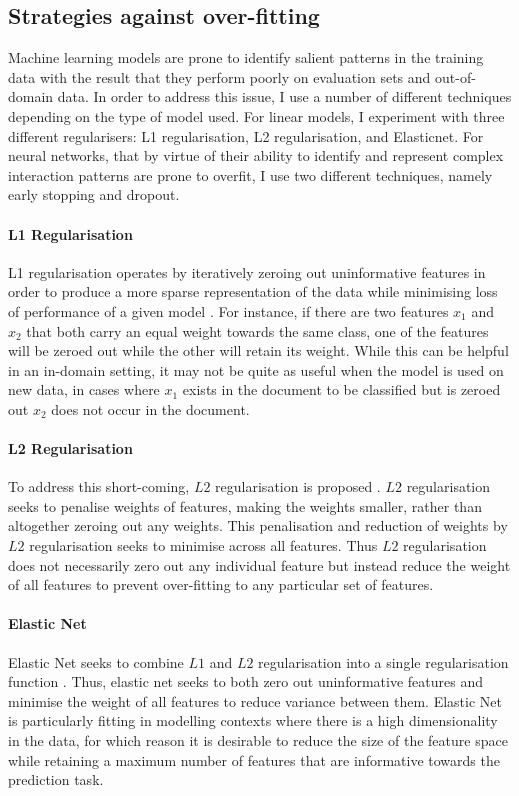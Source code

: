 \subsection{Strategies against over-fitting}\label{sec:anti-overfit}

Machine learning models are prone to identify salient patterns in the training data with the result that they perform poorly on evaluation sets and out-of-domain data. In order to address this issue, I use a number of different techniques depending on the type of model used.
For linear models, I experiment with three different regularisers: L1 regularisation, L2 regularisation, and Elasticnet.
For neural networks, that by virtue of their ability to identify and represent complex interaction patterns are prone to overfit, I use two different techniques, namely early stopping and dropout.

\paragraph*{L1 Regularisation} L1 regularisation operates by iteratively zeroing out uninformative features in order to produce a more sparse representation of the data while minimising loss of performance of a given model \citep{Goldberg:2017}. For instance, if there are two features $x_1$ and $x_2$ that both carry an equal weight towards the same class, one of the features will be zeroed out while the other will retain its weight. While this can be helpful in an in-domain setting, it may not be quite as useful when the model is used on new data, in cases where $x_1$ exists in the document to be classified but is zeroed out $x_2$ does not occur in the document.

\paragraph*{L2 Regularisation} To address this short-coming, $L2$ regularisation is proposed \citep{Goldberg:2017}. $L2$ regularisation seeks to penalise weights of features, making the weights smaller, rather than altogether zeroing out any weights. This penalisation and reduction of weights by $L2$ regularisation seeks to minimise across all features. Thus $L2$ regularisation does not necessarily zero out any individual feature but instead reduce the weight of all features to prevent over-fitting to any particular set of features.

\paragraph*{Elastic Net} Elastic Net seeks to combine $L1$ and $L2$ regularisation into a single regularisation function \citep{Goldberg:2017}. Thus, elastic net seeks to both zero out uninformative features and minimise the weight of all features to reduce variance between them. Elastic Net is particularly fitting in modelling contexts where there is a high dimensionality in the data, for which reason it is desirable to reduce the size of the feature space while retaining a maximum number of features that are informative towards the prediction task.

